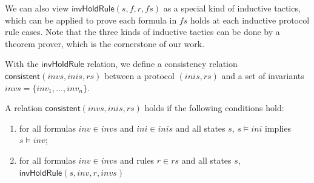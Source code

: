 \documentclass[final]{IEEEtran}
\begin{document}
We can also view $\mathsf{invHoldRule}(s, f, r, fs)$ as a
special kind of inductive tactics, which can be applied to prove
each formula in $fs$ holds at each inductive protocol rule cases. Note that the three kinds of inductive tactics can be done by a theorem prover, which is the cornerstone of our work.

With the $\mathsf{invHoldRule}$ relation, we define a consistency relation $\mathsf{consistent}( invs,inis, rs)$ between a protocol $(inis,rs)$ and a set of invariants $invs=\{inv_1,\ldots, inv_n\}$.

\begin{definition}
A relation  $\mathsf{consistent}( invs,inis, rs)$ holds if the following conditions hold:
\begin{enumerate}
\item for all formulas $inv\in invs$ and $ini\in inis$ and all states $s$,
$s \models ini$ implies $s \models inv$;
\item for all formulas $inv\in invs$ and rules  $r \in rs$ and all states $s$,  $\mathsf{invHoldRule}(s, inv, r, invs   )$
\end{enumerate}
\end{definition}




\end{document}
